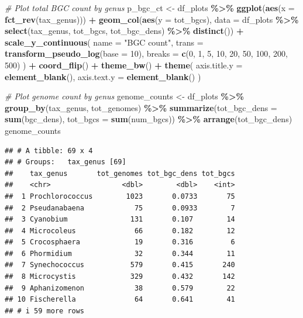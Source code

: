 \documentclass[
]{article}
\newenvironment{Shaded}{\begin{snugshade}}{\end{snugshade}}
\newcommand{\AttributeTok}[1]{\textcolor[rgb]{0.13,0.29,0.53}{#1}}
\newcommand{\CommentTok}[1]{\textcolor[rgb]{0.56,0.35,0.01}{\textit{#1}}}
\newcommand{\DecValTok}[1]{\textcolor[rgb]{0.00,0.00,0.81}{#1}}
\newcommand{\FunctionTok}[1]{\textcolor[rgb]{0.13,0.29,0.53}{\textbf{#1}}}
\newcommand{\NormalTok}[1]{#1}
\newcommand{\OtherTok}[1]{\textcolor[rgb]{0.56,0.35,0.01}{#1}}
\newcommand{\SpecialCharTok}[1]{\textcolor[rgb]{0.81,0.36,0.00}{\textbf{#1}}}
\newcommand{\StringTok}[1]{\textcolor[rgb]{0.31,0.60,0.02}{#1}}
\begin{document}
\begin{Shaded}
\begin{Highlighting}[]
\CommentTok{\# Plot total BGC count by genus}
\NormalTok{p\_bgc\_ct }\OtherTok{\textless{}{-}}\NormalTok{ df\_plots }\SpecialCharTok{\%\textgreater{}\%}
  \FunctionTok{ggplot}\NormalTok{(}\FunctionTok{aes}\NormalTok{(}\AttributeTok{x =} \FunctionTok{fct\_rev}\NormalTok{(tax\_genus))) }\SpecialCharTok{+}
  \FunctionTok{geom\_col}\NormalTok{(}\FunctionTok{aes}\NormalTok{(}\AttributeTok{y =}\NormalTok{ tot\_bgcs), }\AttributeTok{data =}\NormalTok{ df\_plots }\SpecialCharTok{\%\textgreater{}\%} \FunctionTok{select}\NormalTok{(tax\_genus, tot\_bgcs, tot\_bgc\_dens) }\SpecialCharTok{\%\textgreater{}\%} \FunctionTok{distinct}\NormalTok{()) }\SpecialCharTok{+}
  \FunctionTok{scale\_y\_continuous}\NormalTok{(}
    \AttributeTok{name =} \StringTok{"BGC count"}\NormalTok{,}
    \AttributeTok{trans =} \FunctionTok{transform\_pseudo\_log}\NormalTok{(}\AttributeTok{base =} \DecValTok{10}\NormalTok{),}
    \AttributeTok{breaks =} \FunctionTok{c}\NormalTok{(}\DecValTok{0}\NormalTok{, }\DecValTok{1}\NormalTok{, }\DecValTok{5}\NormalTok{, }\DecValTok{10}\NormalTok{, }\DecValTok{20}\NormalTok{, }\DecValTok{50}\NormalTok{, }\DecValTok{100}\NormalTok{, }\DecValTok{200}\NormalTok{, }\DecValTok{500}\NormalTok{)}
\NormalTok{  ) }\SpecialCharTok{+}
  \FunctionTok{coord\_flip}\NormalTok{() }\SpecialCharTok{+}
  \FunctionTok{theme\_bw}\NormalTok{() }\SpecialCharTok{+}
  \FunctionTok{theme}\NormalTok{(}
    \AttributeTok{axis.title.y =} \FunctionTok{element\_blank}\NormalTok{(),}
    \AttributeTok{axis.text.y =} \FunctionTok{element\_blank}\NormalTok{()}
\NormalTok{  )}

\CommentTok{\# Plot genome count by genus}
\NormalTok{genome\_counts }\OtherTok{\textless{}{-}}\NormalTok{ df\_plots }\SpecialCharTok{\%\textgreater{}\%}
  \FunctionTok{group\_by}\NormalTok{(tax\_genus, tot\_genomes) }\SpecialCharTok{\%\textgreater{}\%}
  \FunctionTok{summarize}\NormalTok{(}\AttributeTok{tot\_bgc\_dens =} \FunctionTok{sum}\NormalTok{(bgc\_dens), }\AttributeTok{tot\_bgcs =} \FunctionTok{sum}\NormalTok{(num\_bgcs)) }\SpecialCharTok{\%\textgreater{}\%}
  \FunctionTok{arrange}\NormalTok{(tot\_bgc\_dens)}
\NormalTok{genome\_counts}
\end{Highlighting}
\end{Shaded}

\begin{verbatim}
## # A tibble: 69 x 4
## # Groups:   tax_genus [69]
##    tax_genus       tot_genomes tot_bgc_dens tot_bgcs
##    <chr>                 <dbl>        <dbl>    <int>
##  1 Prochlorococcus        1023       0.0733       75
##  2 Pseudanabaena            75       0.0933        7
##  3 Cyanobium               131       0.107        14
##  4 Microcoleus              66       0.182        12
##  5 Crocosphaera             19       0.316         6
##  6 Phormidium               32       0.344        11
##  7 Synechococcus           579       0.415       240
##  8 Microcystis             329       0.432       142
##  9 Aphanizomenon            38       0.579        22
## 10 Fischerella              64       0.641        41
## # i 59 more rows
\end{verbatim}
\end{document}
